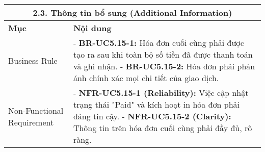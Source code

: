 \begin{longtable}{|m{4cm}|p{11cm}|}
\hline
\multicolumn{2}{|c|}{\textbf{2.3. Thông tin bổ sung (Additional Information)}} \\
\hline
\textbf{Mục} & \textbf{Nội dung} \\
\hline
Business Rule & - \textbf{BR-UC5.15-1:} Hóa đơn cuối cùng phải được tạo ra sau khi toàn bộ số tiền đã được thanh toán và ghi nhận. \newline - \textbf{BR-UC5.15-2:} Hóa đơn phải phản ánh chính xác mọi chi tiết của giao dịch. \\
\hline
Non-Functional Requirement & - \textbf{NFR-UC5.15-1 (Reliability):} Việc cập nhật trạng thái "Paid" và kích hoạt in hóa đơn phải đáng tin cậy. \newline - \textbf{NFR-UC5.15-2 (Clarity):} Thông tin trên hóa đơn cuối cùng phải đầy đủ, rõ ràng. \\
\hline
\end{longtable}

